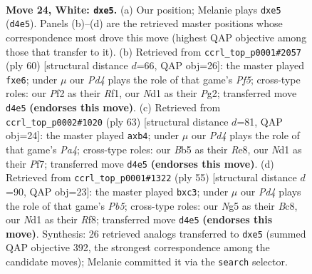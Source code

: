\documentclass[11pt]{article}
\begin{document}
\clearpage

\begin{figure}[p]\centering
\begin{subfigure}{0.46\textwidth}\centering
\resizebox{\linewidth}{!}{%
\newchessgame
\chessboard[
  setfen={1nb2r1k/8/1p2p1p1/1B2qpN1/3P2p1/8/r1P2PP1/2RN1K2 w - - 0 24},
  showmover=false,
  pgfstyle=straightmove, color=movearrow, markmove={d4-e5}
]}
\caption{}
\end{subfigure}\hfill
\begin{subfigure}{0.46\textwidth}\centering
\resizebox{\linewidth}{!}{%
\newchessgame
\chessboard[
  setfen={r5k1/6p1/3Pqp1p/p1B2P2/Pp6/1b5P/1P4P1/5RK1 w - - 0 31},
  showmover=false,
  pgfstyle=straightmove, color=movearrow, markmove={f5-e6}
]}
\caption{}
\end{subfigure}
\\[4pt]
\begin{subfigure}{0.46\textwidth}\centering
\resizebox{\linewidth}{!}{%
\newchessgame
\chessboard[
  setfen={4r1k1/5p2/b4np1/p2Pp2p/NQ2P3/6PP/5PB1/2R3K1 b - - 0 32},
  showmover=false,
  pgfstyle=straightmove, color=movearrow, markmove={a5-b4}
]}
\caption{}
\end{subfigure}\hfill
\begin{subfigure}{0.46\textwidth}\centering
\resizebox{\linewidth}{!}{%
\newchessgame
\chessboard[
  setfen={2b2rk1/5p1p/1n4p1/2pP4/1p6/1PQ3NP/4BPP1/3R2K1 b - - 0 28},
  showmover=false,
  pgfstyle=straightmove, color=movearrow, markmove={b4-c3}
]}
\caption{}
\end{subfigure}
\caption{\textbf{Move 24, White: \texttt{dxe5}.} (a) Our position; Melanie plays \texttt{dxe5} (\texttt{d4e5}). Panels (b)--(d) are the retrieved master positions whose correspondence most drove this move (highest QAP objective among those that transfer to it). (b) Retrieved from \texttt{ccrl\_top\_p0001\#2057} (ply 60) [structural distance $d$=66, QAP obj=26]: the master played \texttt{fxe6}; under $\mu$ our \emph{Pd4} plays the role of that game's \emph{Pf5}; cross-type roles: our \emph{P}f2 as their \emph{R}f1, our \emph{N}d1 as their \emph{P}g2; transferred move \texttt{d4e5} \textbf{(endorses this move)}. (c) Retrieved from \texttt{ccrl\_top\_p0002\#1020} (ply 63) [structural distance $d$=81, QAP obj=24]: the master played \texttt{axb4}; under $\mu$ our \emph{Pd4} plays the role of that game's \emph{Pa4}; cross-type roles: our \emph{B}b5 as their \emph{R}e8, our \emph{N}d1 as their \emph{P}f7; transferred move \texttt{d4e5} \textbf{(endorses this move)}. (d) Retrieved from \texttt{ccrl\_top\_p0001\#1322} (ply 55) [structural distance $d$=90, QAP obj=23]: the master played \texttt{bxc3}; under $\mu$ our \emph{Pd4} plays the role of that game's \emph{Pb5}; cross-type roles: our \emph{N}g5 as their \emph{B}c8, our \emph{N}d1 as their \emph{R}f8; transferred move \texttt{d4e5} \textbf{(endorses this move)}. Synthesis: 26 retrieved analogs transferred to \texttt{dxe5} (summed QAP objective 392, the strongest correspondence among the candidate moves); Melanie committed it via the \texttt{search} selector.}
\label{fig:thought-m46}
\end{figure}
\end{document}
